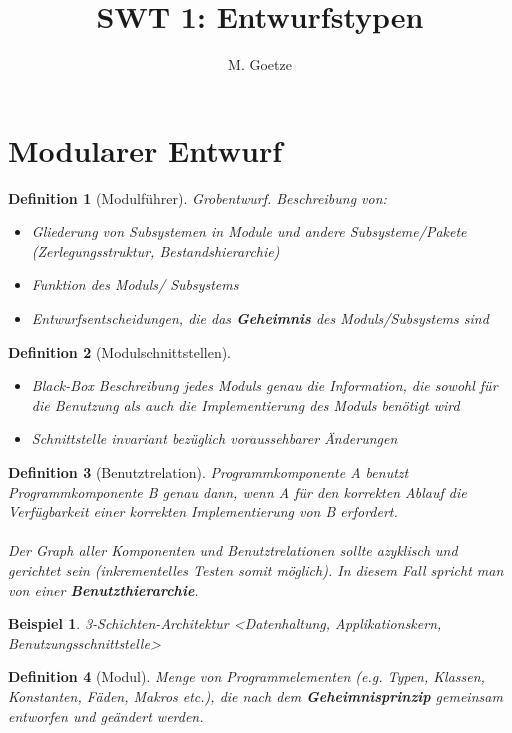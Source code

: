 \documentclass[a4paper]{article}
\title{SWT 1: Entwurfstypen}
\author{M. Goetze}
\theoremstyle{break}
\newtheorem{defi}{Definition}[section]
\newtheorem{ex}{Beispiel}[section]
\begin{document}
	\maketitle
	\tableofcontents
	\newpage
	
\section{Modularer Entwurf}
\begin{defi}[Modulführer]
	Grobentwurf. Beschreibung von:
	\begin{itemize}
		\item Gliederung von Subsystemen in Module und andere Subsysteme/Pakete (Zerlegungsstruktur, Bestandshierarchie)
		\item Funktion des Moduls/ Subsystems
		\item Entwurfsentscheidungen, die das \textbf{Geheimnis} des Moduls/Subsystems sind
	\end{itemize}
\end{defi}

\begin{defi}[Modulschnittstellen]
	\begin{itemize}
		\item Black-Box Beschreibung jedes Moduls
		\subitem genau die Information, die sowohl für die Benutzung als auch die Implementierung des Moduls benötigt wird
		\item Schnittstelle invariant bezüglich voraussehbarer Änderungen
	\end{itemize}

\end{defi}

\begin{defi}[Benutztrelation]
	Programmkomponente A benutzt Programmkomponente B genau dann, wenn A für den korrekten Ablauf die Verfügbarkeit einer korrekten Implementierung von B erfordert.\\
	\\
	Der Graph aller Komponenten und Benutztrelationen sollte azyklisch und gerichtet sein (inkrementelles Testen somit möglich). In diesem Fall spricht man von einer \textbf{Benutzthierarchie}.
\end{defi}

\begin{ex}
	3-Schichten-Architektur
	<Datenhaltung, Applikationskern, Benutzungsschnittstelle>
\end{ex}

\begin{defi}[Modul]
	Menge von Programmelementen (e.g. Typen, Klassen, Konstanten, Fäden, Makros etc.), die nach dem \textbf{Geheimnisprinzip} gemeinsam entworfen und geändert werden. 
\end{defi}
	
\end{document}

